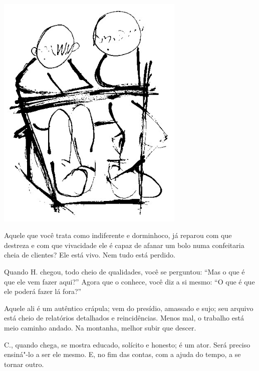 \begin{vplace}[.50]
\begin{center}
\includegraphics[width=90mm]{./imgs/Image_5.jpg}
\end{center}
\end{vplace}

\pagebreak

Aquele que você trata como indiferente e dorminhoco, já reparou com que
destreza e com que vivacidade ele é capaz de afanar um bolo numa
confeitaria cheia de clientes? Ele está vivo. Nem tudo está perdido.

\bigskip
\bigskip

Quando H. chegou, todo cheio de qualidades, você se perguntou: ``Mas o
que é que ele vem fazer aqui?'' Agora que o conhece, você diz a si
mesmo: ``O que é que ele poderá fazer lá fora?''

\bigskip
\bigskip

Aquele ali é um autêntico crápula; vem do presídio, amassado e sujo; seu
arquivo está cheio de relatórios detalhados e reincidências. Menos mal,
o trabalho está meio caminho andado. Na montanha, melhor subir que
descer.

\bigskip
\bigskip

C., quando chega, se mostra educado, solícito e honesto; é um ator. Será
preciso ensiná"-lo a ser ele mesmo. E, no fim das contas, com a ajuda do
tempo, a se tornar outro.

\bigskip
\bigskip

